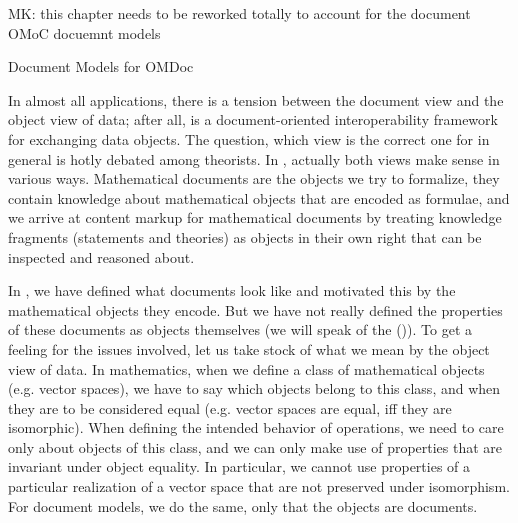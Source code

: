 
\begin{oldpart}{MK: this chapter needs to be reworked totally to account for the document
    OMoC docuemnt models}
\begin{tchapter}[id=document-model]{Document Models for OMDoc}

  In almost all {\xml} applications, there is a tension between the document view and the
  object view of data; after all, {\xml} is a document-oriented interoperability framework
  for exchanging data objects. The question, which view is the correct one for {\xml} in
  general is hotly debated among {\xml} theorists. In {\omdoc}, actually both views make
  sense in various ways. Mathematical documents are the objects we try to formalize, they
  contain knowledge about mathematical objects that are encoded as formulae, and we arrive
  at content markup for mathematical documents by treating knowledge fragments (statements
  and theories) as objects in their own right that can be inspected and reasoned about.

  In {}, we have defined what {\omdoc} documents look like and
  motivated this by the mathematical objects they encode. But we have not really defined
  the properties of these documents as objects themselves (we will speak of the {\omdoc}
  {} ({})). To get a feeling for the
  issues involved, let us take stock of what we mean by the object view of data. In
  mathematics, when we define a class of mathematical objects (e.g.  vector spaces), we
  have to say which objects belong to this class, and when they are to be considered equal
  (e.g.  vector spaces are equal, iff they are isomorphic). When defining the intended
  behavior of operations, we need to care only about objects of this class, and we can
  only make use of properties that are invariant under object equality. In particular, we
  cannot use properties of a particular realization of a vector space that are not
  preserved under isomorphism. For document models, we do the same, only that the objects
  are documents.



\end{tchapter}
\end{oldpart}
